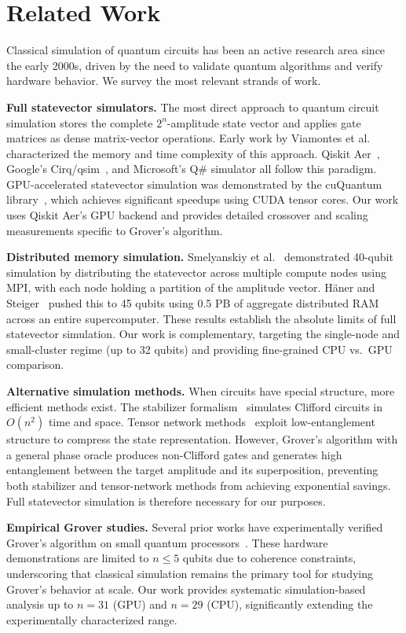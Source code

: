 \documentclass[sigconf, authorversion=true, nonacm=true]{acmart}
\begin{document}
\section{Related Work}

Classical simulation of quantum circuits has been an active research area since the early 2000s, driven by the need to validate quantum algorithms and verify hardware behavior. We survey the most relevant strands of work.

\textbf{Full statevector simulators.} The most direct approach to quantum circuit simulation stores the complete $2^n$-amplitude state vector and applies gate matrices as dense matrix-vector operations. Early work by Viamontes et al.~\cite{Viamontes2003} characterized the memory and time complexity of this approach. Qiskit Aer~\cite{Qiskit}, Google's Cirq/qsim~\cite{qsim}, and Microsoft's Q\# simulator all follow this paradigm. GPU-accelerated statevector simulation was demonstrated by the cuQuantum library~\cite{cuQuantum}, which achieves significant speedups using CUDA tensor cores. Our work uses Qiskit Aer's GPU backend and provides detailed crossover and scaling measurements specific to Grover's algorithm.

\textbf{Distributed memory simulation.} Smelyanskiy et al.~\cite{Smelyanskiy2016} demonstrated 40-qubit simulation by distributing the statevector across multiple compute nodes using MPI, with each node holding a partition of the amplitude vector. Häner and Steiger~\cite{Haener2017} pushed this to 45 qubits using 0.5 PB of aggregate distributed RAM across an entire supercomputer. These results establish the absolute limits of full statevector simulation. Our work is complementary, targeting the single-node and small-cluster regime (up to 32 qubits) and providing fine-grained CPU vs.\ GPU comparison.

\textbf{Alternative simulation methods.} When circuits have special structure, more efficient methods exist. The stabilizer formalism~\cite{Gottesman1998} simulates Clifford circuits in $O(n^2)$ time and space. Tensor network methods~\cite{Markov2008} exploit low-entanglement structure to compress the state representation. However, Grover's algorithm with a general phase oracle produces non-Clifford gates and generates high entanglement between the target amplitude and its superposition, preventing both stabilizer and tensor-network methods from achieving exponential savings. Full statevector simulation is therefore necessary for our purposes.

\textbf{Empirical Grover studies.} Several prior works have experimentally verified Grover's algorithm on small quantum processors~\cite{Chuang1998, Figgatt2017}. These hardware demonstrations are limited to $n \leq 5$ qubits due to coherence constraints, underscoring that classical simulation remains the primary tool for studying Grover's behavior at scale. Our work provides systematic simulation-based analysis up to $n=31$ (GPU) and $n=29$ (CPU), significantly extending the experimentally characterized range.
\end{document}
